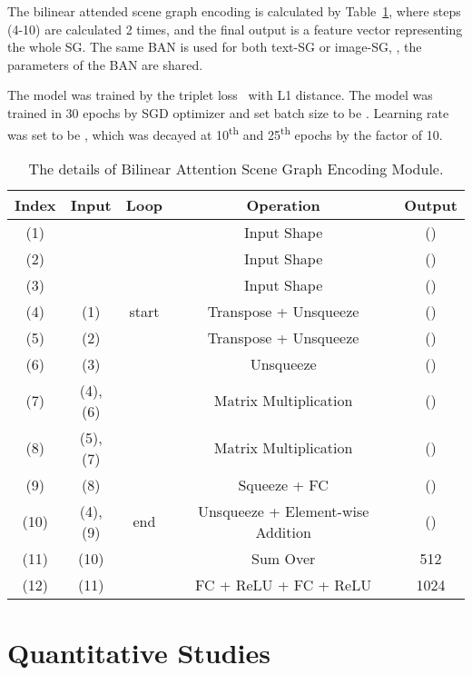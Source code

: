 \documentclass[10pt,twocolumn,letterpaper]{article}
\begin{document}
The bilinear attended scene graph encoding is calculated by Table~\ref{supp_tab:3}, where steps (4-10) are calculated 2 times, and the final output  is a feature vector representing the whole SG. The same BAN is used for both text-SG or image-SG, \ie, the parameters of the BAN are shared. 

The model was trained by the triplet loss~\cite{schroff2015facenet} with L1 distance. The model was trained in 30 epochs by SGD optimizer and set batch size to be . Learning rate was set to be , which was decayed at 10\textsuperscript{th} and 25\textsuperscript{th} epochs by the factor of 10.

\begin{table}
\centering
\scalebox{0.65}
{
\begin{tabular}{| c | c | c | c | c |}
\hline
Index & Input & Loop & Operation & Output \\
\hline 
(1) &  &  & Input Shape & () \\
\hline 
(2) &  &  & Input Shape & () \\
\hline 
(3) &  & & Input Shape & () \\
\hline
(4) & (1) & start & Transpose + Unsqueeze & () \\
\hline
(5) & (2) &  & Transpose + Unsqueeze & () \\
\hline
(6) & (3) &  & Unsqueeze &  () \\
\hline
(7) & (4),(6) &  & Matrix Multiplication & () \\
\hline
(8) & (5),(7) &  & Matrix Multiplication & () \\
\hline
(9) & (8) &  & Squeeze + FC & () \\
\hline
(10) & (4),(9) & end & Unsqueeze + Element-wise Addition & () \\
\hline
(11) & (10) &  & Sum Over  & 512 \\
\hline
(12) & (11) & & FC + ReLU + FC + ReLU & 1024 \\
\hline
\end{tabular}
}
\caption{The details of Bilinear Attention Scene Graph Encoding Module.}
\label{supp_tab:3}
\end{table}

\section{Quantitative Studies}
\label{sec:quantitative}
\end{document}
